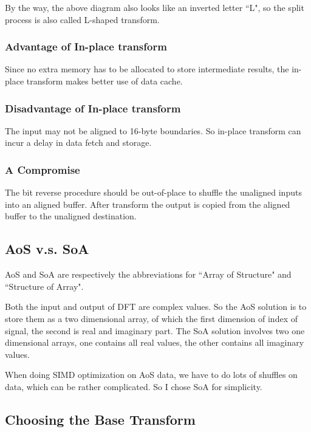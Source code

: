 \documentclass[a4paper]{report}
\begin{document}
\newpage

	By the way, the above diagram also looks like an inverted letter ``L", so the split process is also called L-shaped transform.

\subsubsection{Advantage of In-place transform} \indent

	Since no extra memory has to be allocated to store intermediate results, the in-place transform makes better use of data cache.

\subsubsection{Disadvantage of In-place transform} \indent

	The input may not be aligned to 16-byte boundaries. So in-place transform can incur a delay in data fetch and storage.

\subsubsection{A Compromise} \indent

	The bit reverse procedure should be out-of-place to shuffle the unaligned inputs into an aligned buffer. After transform the output is copied from the aligned buffer to the unaligned destination.

\subsection{AoS v.s. SoA} \indent

	AoS and SoA are respectively the abbreviations for ``Array of Structure" and ``Structure of Array".
	
	Both the input and output of DFT are complex values. So the AoS solution is to store them as a two dimensional array, of which the first dimension of index of signal, the second is real and imaginary part. The SoA solution involves two one dimensional arrays, one contains all real values, the other contains all imaginary values.

	When doing SIMD optimization on AoS data, we have to do lots of shuffles on data, which can be rather complicated. So I chose SoA for simplicity.
	
\subsection{Choosing the Base Transform} \indent
\end{document}
